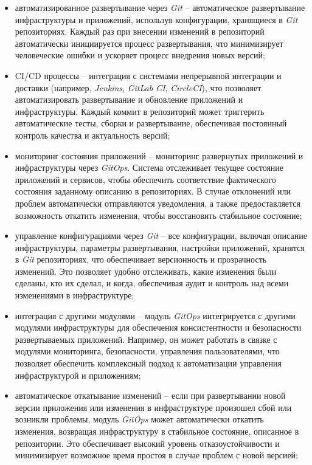 \begin{itemize}
    \item автоматизированное развертывание через \textit{Git} -- автоматическое развертывание инфраструктуры и приложений, используя конфигурации, хранящиеся в \textit{Git} репозиториях. Каждый раз при внесении изменений в репозиторий автоматически инициируется процесс развертывания, что минимизирует человеческие ошибки и ускоряет процесс внедрения новых версий; 
    \item CI/CD процессы -- интеграция с системами непрерывной интеграции и доставки (например, \textit{Jenkins}, \textit{GitLab CI}, \textit{CircleCI}), что позволяет автоматизировать развертывание и обновление приложений и инфраструктуры. Каждый коммит в репозиторий может триггерить автоматические тесты, сборки и развертывание, обеспечивая постоянный контроль качества и актуальность версий;
    \item мониторинг состояния приложений -- мониторинг развернутых приложений и инфраструктуры через \textit{GitOps}. Система отслеживает текущее состояние приложений и сервисов, чтобы обеспечить соответствие фактического состояния заданному описанию в репозиториях. В случае отклонений или проблем автоматически отправляются уведомления, а также предоставляется возможность откатить изменения, чтобы восстановить стабильное состояние; 
    \item управление конфигурациями через \textit{Git} -- все конфигурации, включая описание инфраструктуры, параметры развертывания, настройки приложений, хранятся в \textit{Git} репозиториях, что обеспечивает версионность и прозрачность изменений. Это позволяет удобно отслеживать, какие изменения были сделаны, кто их сделал, и когда, обеспечивая аудит и контроль над всеми изменениями в инфраструктуре;
    \item интеграция с другими модулями -- модуль \textit{GitOps} интегрируется с другими модулями инфраструктуры для обеспечения консистентности и безопасности развертываемых приложений. Например, он может работать в связке с модулями мониторинга, безопасности, управления пользователями, что позволяет обеспечить комплексный подход к автоматизации управления инфраструктурой и приложениям;
    \item автоматическое откатывание изменений -- если при развертывании новой версии приложения или изменения в инфраструктуре произошел сбой или возникли проблемы, модуль \textit{GitOps} может автоматически откатить изменения, возвращая инфраструктуру в стабильное состояние, описанное в репозитории. Это обеспечивает высокий уровень отказоустойчивости и минимизирует возможное время простоя в случае проблем с новой версией; 

\end{itemize}
